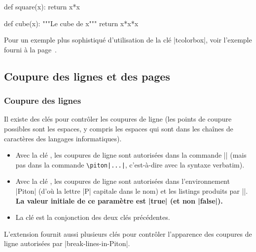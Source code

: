 \documentclass[dvipsnames,svgnames]{article}
\begin{document}
\begin{center}
%
\begin{Piton}
def square(x):
    return x*x
\end{Piton}
\hspace{1cm}
\begin{Piton}
def cube(x):
    """Le cube de x"""
    return x*x*x
\end{Piton}
\end{center}

\bigskip
Pour  un exemple plus sophistiqué d'utilisation de la clé |tcolorbox|, voir l'exemple fourni
à la page~\pageref{examples-tcolorbox}.




\subsection{Coupure des lignes et des pages}

\label{breakable}

\subsubsection{Coupure des lignes}

\label{line-breaks}

Il existe des clés pour contrôler les coupures de ligne (les points de coupure
possibles sont les espaces, y compris les espaces qui sont dans les chaînes de
caractères des langages informatiques).
\begin{itemize}
\item {} Avec la clé
, les coupures de ligne sont autorisées dans la commande
|| (mais pas dans la commande \verb+\piton|...|+, c'est-à-dire avec la syntaxe
verbatim).

\item {} Avec la clé
, les coupures de ligne sont autorisées dans
l'environnement |{Piton}| (d'où la lettre |P| capitale dans le nom) et les
listings produits par |\PitonInputFile|. {\bfseries La valeur initiale de ce paramètre est
|true| (et non |false|).}

\item {} La clé  est la conjonction des deux clés
précédentes.
\end{itemize}

\medskip
L'extension  fournit aussi plusieurs clés pour contrôler l'apparence des
coupures de ligne autorisées par |break-lines-in-Piton|.
\end{document}
